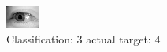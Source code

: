 \begin{figure}[h!]
\begin{center}
\includegraphics[width=0.60\columnwidth]{figures/ID3219_class_3_target_4.png}
\end{center}
\caption{ Classification: 3 actual target: 4}
\label{fig:ID3219_class_3_target_4}
\end{figure}

